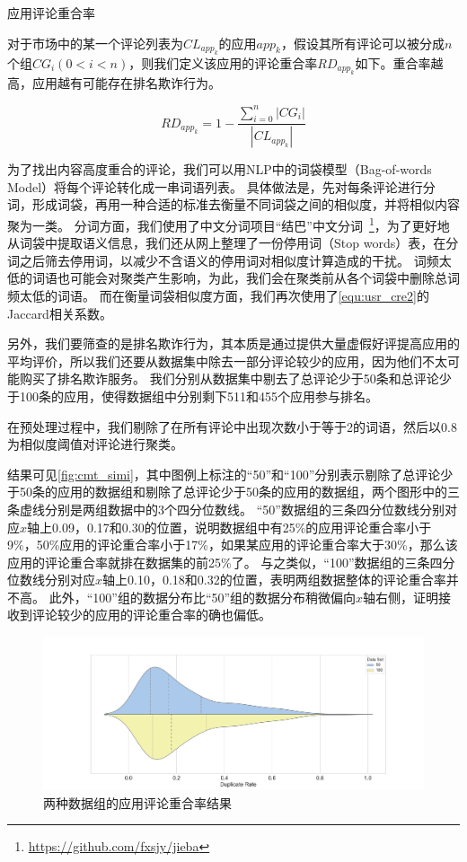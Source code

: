 \begin{Def}
	应用评论重合率

	对于市场中的某一个评论列表为$CL_{app_k}$的应用$app_k$，假设其所有评论可以被分成$n$个组$CG_i (0 <i < n)$，则我们定义该应用的评论重合率$RD_{app_k}$如下。重合率越高，应用越有可能存在排名欺诈行为。
\end{Def}

\begin{equation}
	RD_{app_k} = 1 - \frac{\sum_{i=0}^n|CG_i|}{|CL_{app_k}|}
	\label{equ:cmt_simi1}
\end{equation}
\vspace{0.5mm}

为了找出内容高度重合的评论，我们可以用NLP中的词袋模型（Bag-of-words Model）将每个评论转化成一串词语列表。
具体做法是，先对每条评论进行分词，形成词袋，再用一种合适的标准去衡量不同词袋之间的相似度，并将相似内容聚为一类。
分词方面，我们使用了中文分词项目“结巴”中文分词~\footnote{\url{https://github.com/fxsjy/jieba}}，为了更好地从词袋中提取语义信息，我们还从网上整理了一份停用词（Stop words）表，在分词之后筛去停用词，以减少不含语义的停用词对相似度计算造成的干扰。
词频太低的词语也可能会对聚类产生影响，为此，我们会在聚类前从各个词袋中删除总词频太低的词语。
而在衡量词袋相似度方面，我们再次使用了\autoref{equ:usr_cre2}的Jaccard相关系数。

另外，我们要筛查的是排名欺诈行为，其本质是通过提供大量虚假好评提高应用的平均评价，所以我们还要从数据集中除去一部分评论较少的应用，因为他们不太可能购买了排名欺诈服务。
我们分别从数据集中剔去了总评论少于50条和总评论少于100条的应用，使得数据组中分别剩下511和455个应用参与排名。

在预处理过程中，我们剔除了在所有评论中出现次数小于等于2的词语，然后以0.8为相似度阈值对评论进行聚类。

结果可见\autoref{fig:cmt_simi}，其中图例上标注的``50''和``100''分别表示剔除了总评论少于50条的应用的数据组和剔除了总评论少于50条的应用的数据组，两个图形中的三条虚线分别是两组数据中的3个四分位数线。
``50''数据组的三条四分位数线分别对应$x$轴上0.09，0.17和0.30的位置，说明数据组中有25\%的应用评论重合率小于9\%，50\%应用的评论重合率小于17\%，如果某应用的评论重合率大于30\%，那么该应用的评论重合率就排在数据集的前25\%了。
与之类似，``100''数据组的三条四分位数线分别对应$x$轴上0.10，0.18和0.32的位置，表明两组数据整体的评论重合率并不高。
此外，``100''组的数据分布比``50''组的数据分布稍微偏向$x$轴右侧，证明接收到评论较少的应用的评论重合率的确也偏低。

\begin{figure}[htbp]
	\centering
	\includegraphics[width=\textwidth]{./Figures/edwin-cmt-simi-dist.png}
    \caption{两种数据组的应用评论重合率结果}
    \label{fig:cmt_simi}
\end{figure}

